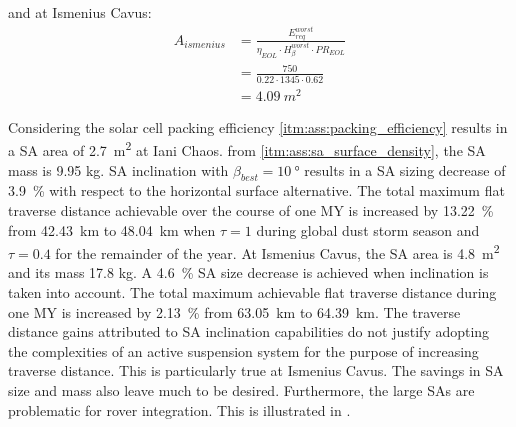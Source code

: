 and at Ismenius Cavus:
\begin{align}
  \label{calc:solar_cell_area_ismenius_cavus_traverse}
  A_{ismenius} &= \frac{E_{req}^{worst}}{\eta_{EOL} \cdot H_{\beta}^{worst} \cdot PR_{EOL}}\\
               &= \frac{750}{0.22 \cdot 1345 \cdot 0.62}\\
               &= \SI{4.09}{m^{2}}
\end{align}

Considering the solar cell packing efficiency \ref{itm:ass:packing_efficiency} results in a \ac{SA} area of \SI{2.7}{m^{2}} at Iani Chaos. from \ref{itm:ass:sa_surface_density}, the \ac{SA} mass is 9.95 \si{\kilo\gram}. \ac{SA} inclination with $\beta_{best} = \SI{10}{\degree}$ results in a \ac{SA} sizing decrease of \SI{3.9}{\percent} with respect to the horizontal surface alternative. The total maximum flat traverse distance achievable over the course of one \ac{MY} is increased by \SI{13.22}{\percent} from \SI{42.43}{\kilo\meter} to \SI{48.04}{\kilo\meter} when $\tau = 1$ during global dust storm season and $\tau = 0.4$ for the remainder of the year. At Ismenius Cavus, the \ac{SA} area is \SI{4.8}{m^{2}} and its mass 17.8 \si{\kilo\gram}. A \SI{4.6}{\percent} \ac{SA} size decrease is achieved when inclination is taken into account. The total maximum achievable flat traverse distance during one \ac{MY} is increased by \SI{2.13}{\percent} from \SI{63.05}{\kilo\meter} to \SI{64.39}{\kilo\meter}. The traverse distance gains attributed to \ac{SA} inclination capabilities do not justify adopting the complexities of an active suspension system for the purpose of increasing traverse distance. This is particularly true at Ismenius Cavus. The savings in \ac{SA} size and mass also leave much to be desired. Furthermore, the large \acp{SA} are problematic for rover integration. This is illustrated in .

